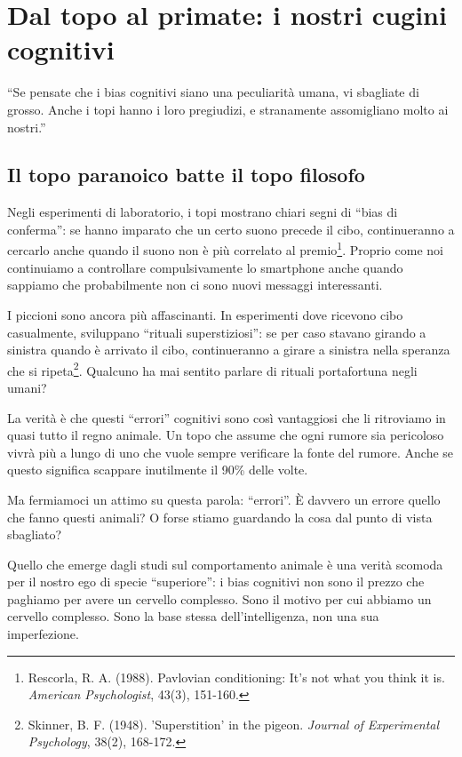 \chapter{Dal topo al primate: i nostri cugini cognitivi}

\epigraph{``Se pensate che i bias cognitivi siano una peculiarità umana, vi sbagliate di grosso. Anche i topi hanno i loro pregiudizi, e stranamente assomigliano molto ai nostri.''}{}

\section{Il topo paranoico batte il topo filosofo}

Negli esperimenti di laboratorio, i topi mostrano chiari segni di ``bias di conferma'': se hanno imparato che un certo suono precede il cibo, continueranno a cercarlo anche quando il suono non è più correlato al premio\footnote{Rescorla, R. A. (1988). Pavlovian conditioning: It's not what you think it is. \emph{American Psychologist}, 43(3), 151-160.}. Proprio come noi continuiamo a controllare compulsivamente lo smartphone anche quando sappiamo che probabilmente non ci sono nuovi messaggi interessanti.

I piccioni sono ancora più affascinanti. In esperimenti dove ricevono cibo casualmente, sviluppano ``rituali superstiziosi'': se per caso stavano girando a sinistra quando è arrivato il cibo, continueranno a girare a sinistra nella speranza che si ripeta\footnote{Skinner, B. F. (1948). 'Superstition' in the pigeon. \emph{Journal of Experimental Psychology}, 38(2), 168-172.}. Qualcuno ha mai sentito parlare di rituali portafortuna negli umani?

La verità è che questi ``errori'' cognitivi sono così vantaggiosi che li ritroviamo in quasi tutto il regno animale. Un topo che assume che ogni rumore sia pericoloso vivrà più a lungo di uno che vuole sempre verificare la fonte del rumore. Anche se questo significa scappare inutilmente il 90\% delle volte.

Ma fermiamoci un attimo su questa parola: ``errori''. È davvero un errore quello che fanno questi animali? O forse stiamo guardando la cosa dal punto di vista sbagliato?

Quello che emerge dagli studi sul comportamento animale è una verità scomoda per il nostro ego di specie ``superiore'': i bias cognitivi non sono il prezzo che paghiamo per avere un cervello complesso. Sono il motivo per cui abbiamo un cervello complesso. Sono la base stessa dell'intelligenza, non una sua imperfezione.

